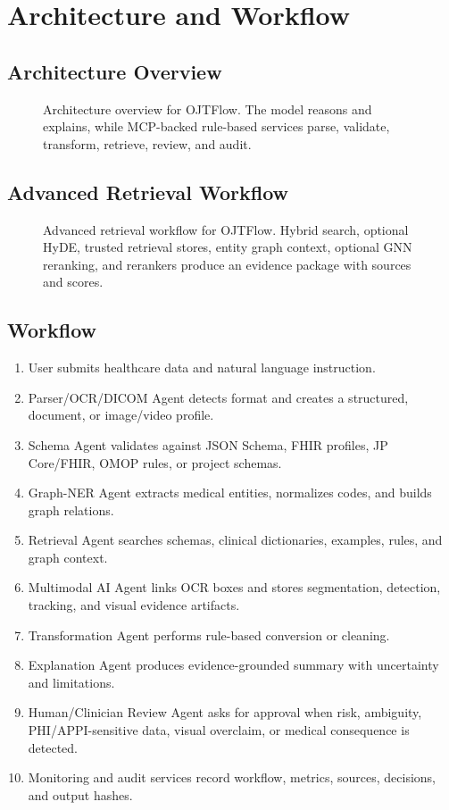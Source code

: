 \documentclass[11pt,a4paper]{article}
\begin{document}
\section{Architecture and Workflow}

\subsection{Architecture Overview}

\begin{figure}[H]
  \centering
  \resizebox{\textwidth}{!}{}
  \caption{Architecture overview for OJTFlow. The model reasons and explains, while MCP-backed rule-based services parse, validate, transform, retrieve, review, and audit.}
\end{figure}

\subsection{Advanced Retrieval Workflow}

\begin{figure}[H]
  \centering
  \resizebox{\textwidth}{!}{}
  \caption{Advanced retrieval workflow for OJTFlow. Hybrid search, optional HyDE, trusted retrieval stores, entity graph context, optional GNN reranking, and rerankers produce an evidence package with sources and scores.}
\end{figure}

\subsection{Workflow}

\begin{enumerate}
  \item User submits healthcare data and natural language instruction.
  \item Parser/OCR/DICOM Agent detects format and creates a structured, document, or image/video profile.
  \item Schema Agent validates against JSON Schema, FHIR profiles, JP Core/FHIR, OMOP rules, or project schemas.
  \item Graph-NER Agent extracts medical entities, normalizes codes, and builds graph relations.
  \item Retrieval Agent searches schemas, clinical dictionaries, examples, rules, and graph context.
  \item Multimodal AI Agent links OCR boxes and stores segmentation, detection, tracking, and visual evidence artifacts.
  \item Transformation Agent performs rule-based conversion or cleaning.
  \item Explanation Agent produces evidence-grounded summary with uncertainty and limitations.
  \item Human/Clinician Review Agent asks for approval when risk, ambiguity, PHI/APPI-sensitive data, visual overclaim, or medical consequence is detected.
  \item Monitoring and audit services record workflow, metrics, sources, decisions, and output hashes.
\end{enumerate}
\end{document}
